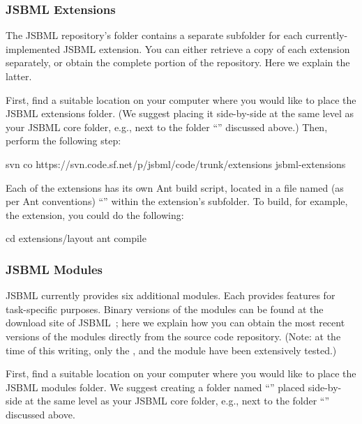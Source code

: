 \subsubsection{JSBML Extensions}

The JSBML repository's  folder contains a separate
subfolder for each currently-implemented JSBML extension. You can either
retrieve a copy of each extension separately, or obtain the complete
 portion of the repository.  Here we explain the latter.

First, find a suitable location on your computer where you would like to
place the JSBML extensions folder.  (We suggest placing it side-by-side at
the same level as your JSBML core folder, e.g., next to the folder
``\dirname'' discussed above.)  Then, perform the following step:

\begin{example}[style=bash, title={Downloading the latest JSBML extensions
    source folder from the project's Subversion repository.}] 
svn co https://svn.code.sf.net/p/jsbml/code/trunk/extensions jsbml-extensions
\end{example}

Each of the extensions has its own Ant build script, located in a file
named (as per Ant conventions) ``'' within the extension's
subfolder.  To build, for example, the  extension, you could
do the following:

\begin{example}[style=bash, title={Compiling the ``\code{layout}'' extension.}]
cd extensions/layout
ant compile
\end{example}


\subsubsection{JSBML Modules}
\label{sec:jsbml-modules}

JSBML currently provides six additional modules.  Each provides features
for task-specific purposes. Binary versions of the modules can be found at
the download site of JSBML~\cite{JSBMLdownload}; here we explain how you
can obtain the most recent versions of the modules directly from the source
code repository.  (Note: at the time of this writing, only the
,  and the  module have been extensively
tested.)

First, find a suitable location on your computer where you would like to
place the JSBML modules folder.  We suggest creating a folder named
``'' placed side-by-side at the same level as your JSBML core
folder, e.g., next to the folder ``\dirname'' discussed above.

